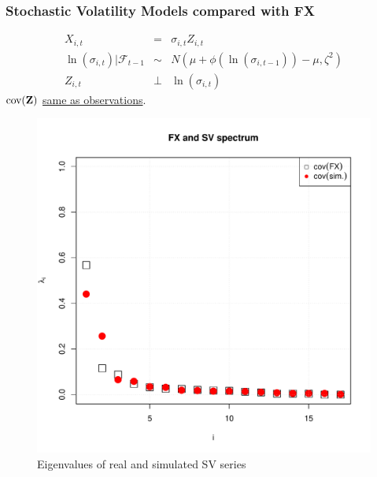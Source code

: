 \documentclass{beamer}
\begin{document}
\begin{frame}
  \frametitle{Stochastic Volatility Models compared with FX}
  \begin{minipage}{0.6\linewidth}
    \begin{scriptsize}
      \begin{eqnarray*}
        X_{i, t} &=& \sigma_{i, t} Z_{i,t} \\
        \ln(\sigma_{i,t})|\mathcal F_{t-1} &\sim& N(\mu + \phi(\ln(\sigma_{i,t-1})) - \mu, \zeta^2)\\
        Z_{i, t} &\bot& \ln(\sigma_{i,t})
      \end{eqnarray*}
      $\text{cov}(\mathbf{Z})$ \underline{same as observations}.
    \end{scriptsize}
  \end{minipage}\hfill
  \begin{minipage}{0.4\linewidth}
    \begin{figure}[htb!]
      \centering
      \includegraphics[width=1.0\linewidth]{FX_sv_eigenvalues.pdf}
      \caption{\scriptsize Eigenvalues of real and simulated SV series}
    \end{figure}
  \end{minipage}
\end{frame}
\end{document}
